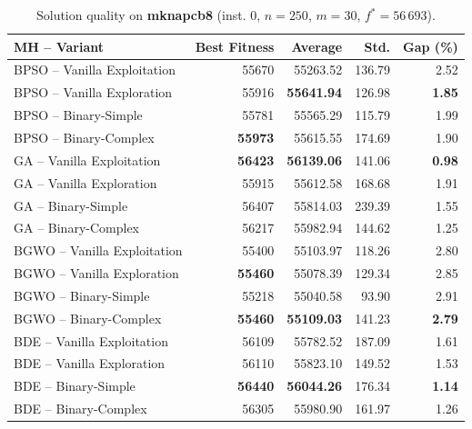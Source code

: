 \begin{table}[htbp]
  \centering
  \small
  \caption{Solution quality on \textbf{mknapcb8} (inst. 0, $n=250$, $m=30$, $f^*=56\,693$).}
  \label{tab:calidad_mknapcb8_0}
  \begin{tabular}{lrrrr}
    \toprule
    \textbf{MH -- Variant} &
    \textbf{Best Fitness} &
    \textbf{Average} &
    \textbf{Std.} &
    \textbf{Gap (\%)} \\
    \midrule
    BPSO -- Vanilla Exploitation &          55670 &         55263.52 & 136.79 &         2.52 \\
    BPSO -- Vanilla Exploration  &          55916 & \textbf{55641.94} & 126.98 & \textbf{1.85} \\
    BPSO -- Binary-Simple        &          55781 &         55565.29 & 115.79 &         1.99 \\
    BPSO -- Binary-Complex       & \textbf{55973} &         55615.55 & 174.69 &         1.90 \\
    \midrule
    GA -- Vanilla Exploitation   & \textbf{56423} & \textbf{56139.06} & 141.06 & \textbf{0.98} \\
    GA -- Vanilla Exploration    &          55915 &         55612.58 & 168.68 &         1.91 \\
    GA -- Binary-Simple          &          56407 &         55814.03 & 239.39 &         1.55 \\
    GA -- Binary-Complex         &          56217 &         55982.94 & 144.62 &         1.25 \\
    \midrule
    BGWO -- Vanilla Exploitation &          55400 &         55103.97 & 118.26 &         2.80 \\
    BGWO -- Vanilla Exploration  & \textbf{55460} &         55078.39 & 129.34 &         2.85 \\
    BGWO -- Binary-Simple        &          55218 &         55040.58 &  93.90 &         2.91 \\
    BGWO -- Binary-Complex       & \textbf{55460} & \textbf{55109.03} & 141.23 & \textbf{2.79} \\
    \midrule
    BDE -- Vanilla Exploitation  &          56109 &         55782.52 & 187.09 &         1.61 \\
    BDE -- Vanilla Exploration   &          56110 &         55823.10 & 149.52 &         1.53 \\
    BDE -- Binary-Simple         & \textbf{56440} & \textbf{56044.26} & 176.34 & \textbf{1.14} \\
    BDE -- Binary-Complex        &          56305 &         55980.90 & 161.97 &         1.26 \\
    \bottomrule
  \end{tabular}
\end{table}

